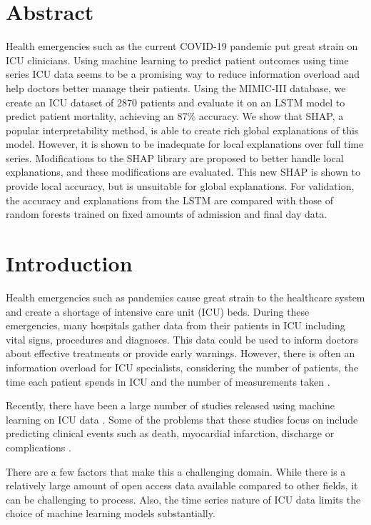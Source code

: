 \documentclass[12pt]{article}
\begin{document}
\newpage
\section*{Abstract}

Health emergencies such as the current COVID-19 pandemic put great strain on ICU clinicians. Using machine learning to predict patient outcomes using time series ICU data seems to be a promising way to reduce information overload and help doctors better manage their patients. Using the MIMIC-III database, we create an ICU dataset of 2870 patients and evaluate it on an LSTM model to predict patient mortality, achieving an 87\% accuracy. We show that SHAP, a popular interpretability method, is able to create rich global explanations of this model. However, it is shown to be inadequate for local explanations over full time series. Modifications to the SHAP library are proposed to better handle local explanations, and these modifications are evaluated. This new SHAP is shown to provide local accuracy, but is unsuitable for global explanations. For validation, the accuracy and explanations from the LSTM are compared with those of random forests trained on fixed amounts of admission and final day data.

\newpage
\tableofcontents
\newpage
\section{Introduction}
Health emergencies such as pandemics cause great strain to the healthcare system and create a shortage of intensive care unit (ICU) beds. During these emergencies, many hospitals gather data from their patients in ICU including vital signs, procedures and diagnoses. This data could be used to inform doctors about effective treatments or provide early warnings. However, there is often an information overload for ICU specialists, considering the number of patients, the time each patient spends in ICU and the number of measurements taken \cite{AIICU}.

Recently, there have been a large number of studies released using machine learning on ICU data \cite{MLICUSystematicReview}. Some of the problems that these studies focus on include predicting clinical events such as death, myocardial infarction, discharge or complications \cite{KajiLSTM, MLICUTechniques}. 

There are a few factors that make this a challenging domain. While there is a relatively large amount of open access data available compared to other fields, it can be challenging to process. Also, the time series nature of ICU data limits the choice of machine learning models substantially.
\end{document}
